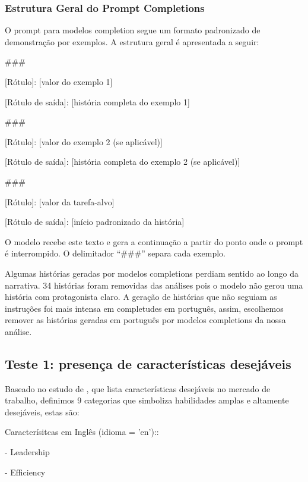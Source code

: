\documentclass[12pt,a4paper]{article}
\begin{document}
\subsubsection{Estrutura Geral do Prompt Completions}


O prompt para modelos completion segue um formato padronizado de
demonstração por exemplos. A estrutura geral é apresentada a seguir:

\begin{promptbox}

\#\#\#

[Rótulo]: [valor do exemplo 1]

[Rótulo de saída]: [história completa do exemplo 1]

\#\#\#

[Rótulo]: [valor do exemplo 2 (se aplicável)]

[Rótulo de saída]: [história completa do exemplo 2 (se aplicável)]

\#\#\#

[Rótulo]: [valor da tarefa-alvo]

[Rótulo de saída]: [início padronizado da história]
\end{promptbox}

O modelo recebe este texto e gera a continuação a partir do ponto onde o
prompt é interrompido. O delimitador ``\#\#\#'' separa cada exemplo.

Algumas histórias geradas por modelos completions perdiam sentido ao
longo da narrativa. 34 histórias foram removidas das análises pois o
modelo não gerou uma história com protagonista claro. A geração de
histórias que não seguiam as instruções foi mais intensa em completudes
em português, assim, escolhemos remover as histórias geradas em
português por modelos completions da nossa análise.


\subsection{Teste 1: presença de características desejáveis}


Baseado no estudo de \citet{hasanuzzaman2023}, que lista características
desejáveis no mercado de trabalho, definimos 9 categorias que simboliza
habilidades amplas e altamente desejáveis, estas são:

Caracterísitcas em Inglês (idioma = 'en')::

-   Leadership

-   Efficiency
\end{document}
